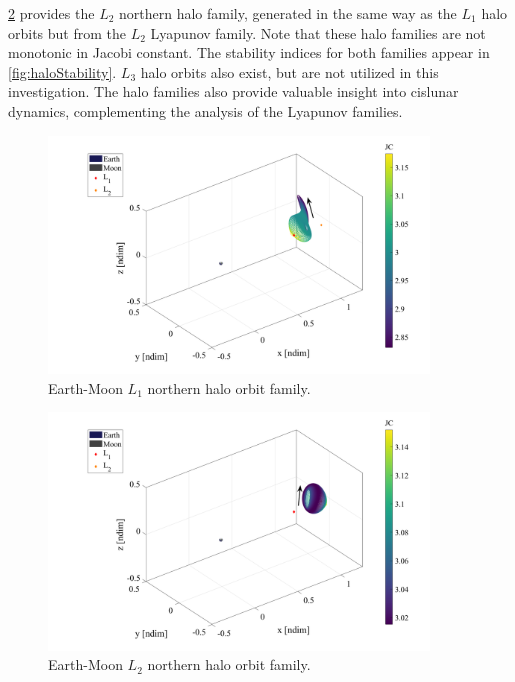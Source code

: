 \cref{fig:L2Halo} provides the $L_{2}$ northern halo family, generated in the same way as the
$L_{1}$ halo orbits but from the $L_{2}$ Lyapunov family. Note that these halo families are not
monotonic in Jacobi constant. The stability indices for both families appear in
\cref{fig:haloStability}. $L_{3}$ halo orbits also exist, but are not utilized in this
investigation. The halo families also provide valuable insight into cislunar dynamics,
complementing the analysis of the Lyapunov families.

\begin{figure}[H]
    \centering
    \includegraphics[width=0.9\textwidth]{figures/L1HaloFamily.pdf}
    \caption{Earth-Moon $L_{1}$ northern halo orbit family.}
    \label{fig:L1Halo}
\end{figure}

\begin{figure}[H]
    \centering
    \includegraphics[width=0.9\textwidth]{figures/L2HaloFamily.pdf}
    \caption{Earth-Moon $L_{2}$ northern halo orbit family.}
    \label{fig:L2Halo}
\end{figure}

